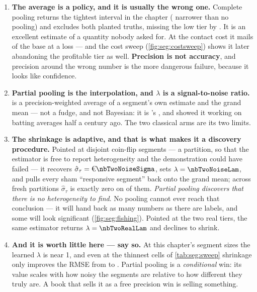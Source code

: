 \begin{enumerate}[leftmargin=*, itemsep=.45em]
  \item \textbf{The average is a policy, and it is usually the wrong one.} Complete pooling returns
        the tightest interval in the chapter (\pc{\nbTwoCpNarrowerPct} narrower than no pooling) and
        excludes both planted truths, missing the low tier by \eur{\nbTwoCpMissLow}. It is an
        excellent estimate of a quantity nobody asked for. At the \eur{\nbTwoCost} contact cost it
        mails \pc{\nbTwoShareLow} of the base at a loss --- and the cost sweep
        (\cref{fig:seg:costsweep}) shows it later abandoning the profitable tier as well.
        \textbf{Precision is not accuracy}, and precision around the wrong number is the more
        dangerous failure, because it looks like confidence.

  \item \textbf{Partial pooling is the interpolation, and $\lambda$ is a signal-to-noise ratio.}
         is a precision-weighted average of a segment's own estimate and the
        grand mean --- not a fudge, and not Bayesian: it is \citeauthor{stein1956}'s
        \citeyearpar{stein1956}, and \citet{efron1975} showed it working on batting averages half a
        century ago. The two classical arms are its two limits.

  \item \textbf{The shrinkage is adaptive, and that is what makes it a discovery procedure.}
        Pointed at \nbTwoNNoise{} disjoint coin-flip segments --- a partition, so that the estimator
        is free to report heterogeneity and the demonstration could have failed --- it recovers
        $\hat\sigma_\tau = \eur{\nbTwoNoiseSigma}$, sets $\lambda = \nbTwoNoiseLam$, and pulls every
        sham ``responsive segment'' back onto the grand mean; across \nbTwoNoiseReps{} fresh
        partitions $\hat\sigma_\tau$ is exactly zero on \pc{\nbTwoNoiseZeroPct} of them. \emph{Partial
        pooling discovers that there is no heterogeneity to find}. No pooling cannot ever reach that
        conclusion --- it will hand back as many numbers as there are labels, and some will look
        significant (\cref{fig:seg:fishing}). Pointed at the two real tiers, the same estimator
        returns $\lambda = \nbTwoRealLam$ and declines to shrink.

  \item \textbf{And it is worth little here --- say so.} At this chapter's segment sizes the learned
        $\lambda$ is near 1, and even at the thinnest cells of \cref{tab:seg:sweep} shrinkage only
        improves the RMSE from \eur{\nbTwoSweepThinNp} to \eur{\nbTwoSweepThinSh}. Partial pooling is
        a \emph{conditional} win: its value scales with how noisy the segments are relative to how
        different they truly are. A book that sells it as a free precision win is selling something.


\end{enumerate}
